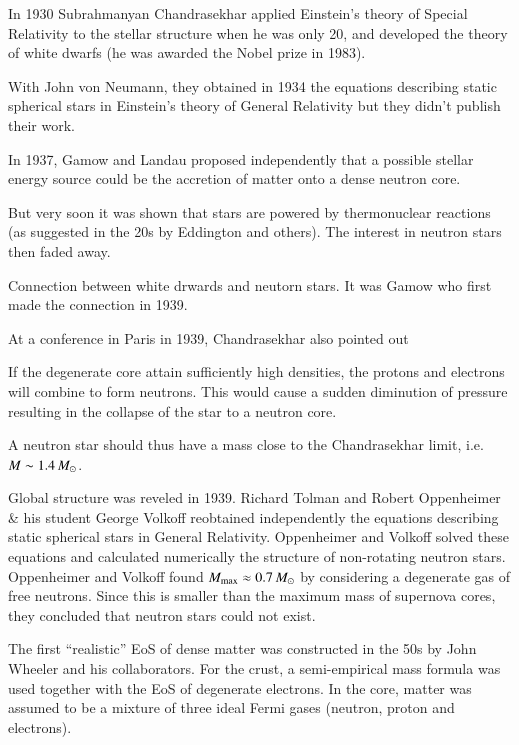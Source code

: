 In 1930 Subrahmanyan Chandrasekhar applied Einstein’s theory of Special Relativity to the stellar structure when he was only 20, and developed the theory of white dwarfs (he was awarded the Nobel prize in 1983).

With John von Neumann, they obtained in 1934 the equations describing static spherical stars in Einstein’s theory of General Relativity but they didn’t publish their work.\cite{Baym82}

In 1937, Gamow and Landau proposed independently that a possible stellar energy source could be the accretion of matter onto a dense neutron core.

But very soon it was shown that stars are powered by thermonuclear reactions (as suggested in the 20s by Eddington and others). 
The interest in neutron stars then faded away.

Connection between white drwards and neutorn stars.
It was Gamow who first made the connection in 1939. \cite{Gamow39}

At a conference in Paris in 1939, Chandrasekhar also pointed out
\begin{displayquote}
If the degenerate core attain sufficiently high densities, the protons and electrons will combine to form neutrons. 
This would cause a sudden diminution of pressure resulting in the collapse of the star to a neutron core.
\end{displayquote}
A neutron star should thus have a mass close to the Chandrasekhar limit, i.e. $M \sim 1.4\, M_{\odot}$.



Global structure was reveled in 1939.
Richard Tolman \cite{Tolman39}
and Robert Oppenheimer \& his student George Volkoff \cite{OV39}
reobtained independently the equations describing static spherical stars in General Relativity.
Oppenheimer and Volkoff solved these equations and calculated numerically the structure of non-rotating neutron stars.
Oppenheimer and Volkoff found $M_{\mathrm{max}} \approx 0.7\, M_{\odot}$ by considering a degenerate gas of free neutrons.
Since this is smaller than the maximum mass of supernova cores, they concluded that neutron stars could not exist.

The first “realistic” EoS of dense matter was constructed in the 50s by John Wheeler and his collaborators.\cite{Wheeler66}
For the crust, a semi-empirical mass formula was used together with the EoS of degenerate electrons. 
In the core, matter was assumed to be a mixture of three ideal Fermi gases (neutron, proton and electrons).


